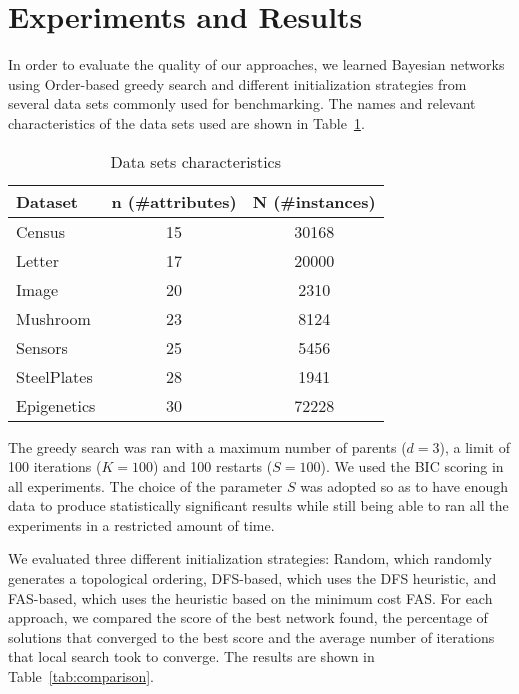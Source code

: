 \section{Experiments and Results}
\label{sec:experiments}

In order to evaluate the quality of our approaches, we learned Bayesian networks using Order-based greedy search and different initialization strategies from several data sets commonly used for benchmarking. The names and relevant characteristics of the data sets used are shown in Table~\ref{tab:datasets}.
	\begin{table}[ h ]
		\centering
		\begin{tabular}{ | l | c | c | }
			\hline
			Dataset & n (\#attributes) & N (\#instances) \\ \hline
			Census & 15 & 30168 \\ \hline
			Letter & 17 & 20000 \\ \hline
			Image & 20 & 2310 \\ \hline
			Mushroom & 23 & 8124 \\ \hline
			Sensors & 25 & 5456 \\ \hline
			SteelPlates & 28 & 1941 \\ \hline
			Epigenetics & 30 & 72228 \\ \hline
		\end{tabular}
		\caption{Data sets characteristics}
		\label{tab:datasets}
	\end{table}
The greedy search was ran with a maximum number of parents ($d=3$), a limit of 100 iterations ($K=100$) and 100 restarts ($S=100$). We used the BIC scoring in all experiments. The choice of the parameter $S$ was adopted so as to have enough data to produce statistically significant results while still being able to ran all the experiments in a restricted amount of time.

We evaluated three different initialization strategies: Random, which randomly generates a topological ordering, DFS-based, which uses the DFS heuristic, and FAS-based, which uses the heuristic based on the minimum cost FAS. For each approach, we compared the score of the best network found, the percentage of solutions that converged to the best score and the average number of iterations that local search took to converge. The results are shown in Table~\ref{tab:comparison}.

